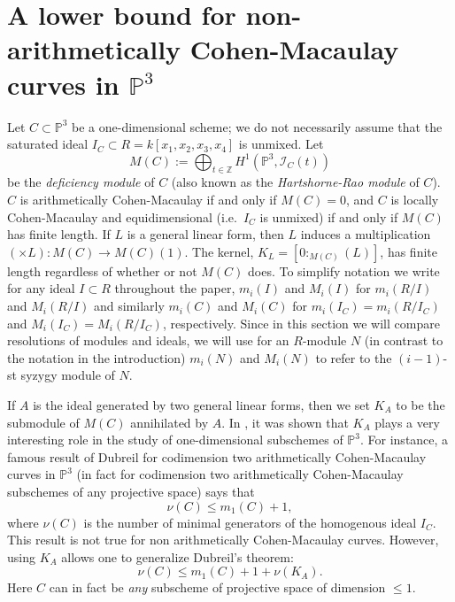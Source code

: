 \documentclass[12pt,twoside]{amsart}
\numberwithin{equation}{section}
\theoremstyle{definition}
\begin{document}


\section{A lower bound for non-arithmetically Cohen-Macaulay curves in ${\mathbb
P}^3$} \label{lower bd P3}

Let $C \subset {\mathbb P}^3$ be a one-dimensional scheme; we do not necessarily
assume that the saturated ideal  $I_C \subset R = k[x_1,x_2,x_3,x_4]$ is unmixed.  Let
\[
M(C) := \bigoplus_{t \in {\mathbb Z}} H^1({\mathbb P}^3, {\mathcal I}_C(t))
\]
 be the {\em deficiency module} of $C$ (also known as the {\em Hartshorne-Rao
module} of $C$).  $C$ is arithmetically Cohen-Macaulay if and only if $M(C) = 0$, and $C$
is locally Cohen-Macaulay and equidimensional (i.e.\ $I_C$ is unmixed) if and only if
$M(C)$ has finite length.  If $L$ is a general linear form, then $L$ induces a
multiplication $(\times L) : M(C) \rightarrow M(C)(1)$.  The kernel, $K_L = [0:_{M(C)}
(L)]$, has finite length regardless of whether or not $M(C)$ does. To simplify notation
we write for any ideal $I \subset R$ throughout the paper, $m_i (I)$ and $M_i (I)$ for
$m_i (R/I)$ and $M_i (R/I)$ and similarly $m_i (C)$ and $M_i (C)$ for $m_i (I_C) = m_i
(R/I_C)$ and $M_i (I_C) = M_i (R/I_C)$, respectively. Since in this section we will
compare resolutions of modules and ideals, we will use for an $R$-module $N$ (in contrast
to the notation in the introduction) $m_i (N)$ and $M_i (N)$ to refer to the $(i-1)$-st
syzygy module of $N$.

If $A$ is the ideal generated by two general linear forms, then we set $K_A$ to
be the submodule of $M(C)$ annihilated by $A$.  In \cite{london}, it was shown
that $K_A$ plays a very interesting role in the study of one-dimensional
subschemes of ${\mathbb P}^3$.  For instance, a famous result of Dubreil for
codimension two arithmetically Cohen-Macaulay curves in ${\mathbb P}^3$ (in fact
for codimension two arithmetically Cohen-Macaulay subschemes of any projective
space) says that
\[
\nu(C) \leq m_1(C) +1,
\]
where $\nu(C)$ is the number of minimal generators of the homogenous ideal $I_C$.  This
result is not true for non arithmetically Cohen-Macaulay curves.  However, using $K_A$
allows one to generalize Dubreil's theorem:
\[
\nu(C) \leq m_1(C) + 1 + \nu(K_A).
\]
Here $C$ can in fact be {\em any} subscheme of projective space of dimension $\leq 1$.
\end{document}
